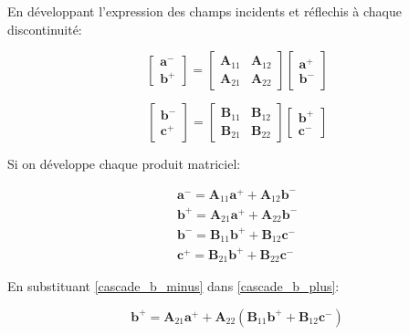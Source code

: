 \documentclass[12pt,a4paper]{report}
\begin{document}
En développant l'expression des champs incidents et réflechis à chaque discontinuité:

\begin{equation}
\begin{bmatrix} \mathbf{a}^- \\ \mathbf{b}^+ \end{bmatrix} = \begin{bmatrix} \mathbf{A}_{11} & \mathbf{A}_{12} \\ \mathbf{A}_{21} & \mathbf{A}_{22} \end{bmatrix} \begin{bmatrix} \mathbf{a}^+ \\ \mathbf{b}^- \end{bmatrix}
\end{equation}

\begin{equation}
\begin{bmatrix} \mathbf{b}^- \\ \mathbf{c}^+ \end{bmatrix} = \begin{bmatrix} \mathbf{B}_{11} & \mathbf{B}_{12} \\ \mathbf{B}_{21} & \mathbf{B}_{22} \end{bmatrix} \begin{bmatrix} \mathbf{b}^+ \\ \mathbf{c}^- \end{bmatrix}
\end{equation}

Si on développe chaque produit matriciel:

\begin{align}
    \mathbf{a}^- = \mathbf{A}_{11} \mathbf{a}^+ + \mathbf{A}_{12} \mathbf{b}^- \label{cascade_a_minus} \\
    \mathbf{b}^+ = \mathbf{A}_{21} \mathbf{a}^+ + \mathbf{A}_{22} \mathbf{b}^- \label{cascade_b_plus} \\
    \mathbf{b}^- = \mathbf{B}_{11} \mathbf{b}^+ + \mathbf{B}_{12} \mathbf{c}^- \label{cascade_b_minus}\\
    \mathbf{c}^+ = \mathbf{B}_{21} \mathbf{b}^+ + \mathbf{B}_{22} \mathbf{c}^- \label{cascade_c_plus} 
\end{align}

En substituant \ref{cascade_b_minus} dans \ref{cascade_b_plus}:

\begin{equation}
    \mathbf{b}^+ = \mathbf{A}_{21} \mathbf{a}^+ + \mathbf{A}_{22} (\mathbf{B}_{11} \mathbf{b}^+ + \mathbf{B}_{12} \mathbf{c}^- )
\end{equation}
\end{document}

